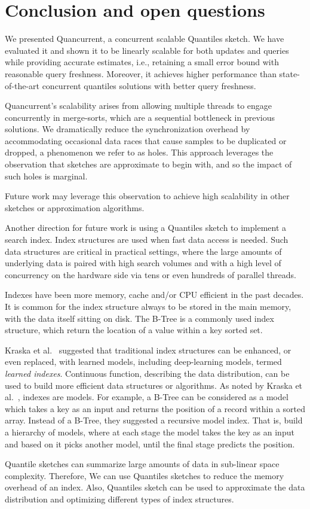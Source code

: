 \chapter{Conclusion and open questions}
\label{chap:conclusion}



We presented Quancurrent, a concurrent scalable Quantiles sketch. We have evaluated it and shown it to be linearly scalable for both updates and queries while providing accurate estimates, i.e., retaining a small error bound with reasonable query freshness. Moreover, it achieves higher performance than state-of-the-art concurrent quantiles solutions with better query freshness.

Quancurrent's scalability arises from allowing multiple threads to engage concurrently in merge-sorts, which are a sequential bottleneck in previous solutions. We dramatically reduce the synchronization overhead by accommodating occasional data races that cause samples to be duplicated or dropped, a phenomenon we refer to as holes. This approach leverages the observation that sketches are approximate to begin with, and so the impact of such holes is marginal.

Future work may leverage this observation to achieve high scalability in other sketches or approximation algorithms.

Another direction for future work is using a Quantiles sketch to implement a search index. Index structures are used when fast data access is needed. Such data structures are critical in practical settings, where the large amounts of underlying data is paired with high search volumes and with a high level of concurrency on the hardware side via tens or even hundreds of parallel threads. 

Indexes have been more memory, cache and/or CPU efficient in the past decades. It is common for the index structure always to be stored in the main memory, with the data itself sitting on disk. The B-Tree is a commonly used index structure, which return the location of a value within a key sorted set. 

Kraska et al.~\cite{case_learned_index} suggested that traditional index structures can be enhanced, or even replaced, with learned models, including deep-learning models, termed \emph{learned indexes}. Continuous function, describing the data distribution, can be used to build more efficient data structures or algorithms. As noted by Kraska et al.~\cite{case_learned_index}, indexes are models. For example, a B-Tree can be considered as a model which takes a key as an input and returns the position of a record within a sorted array. Instead of a B-Tree, they suggested a recursive model index. That is, build a hierarchy of models, where at each stage the model takes the key as an input and based on it picks another model, until the final stage predicts the position.

Quantile sketches can summarize large amounts of data in sub-linear space complexity. Therefore, We can use Quantiles sketches to reduce the memory overhead of an index. Also, Quantiles sketch can be used to approximate the data distribution and optimizing different types of index structures.

